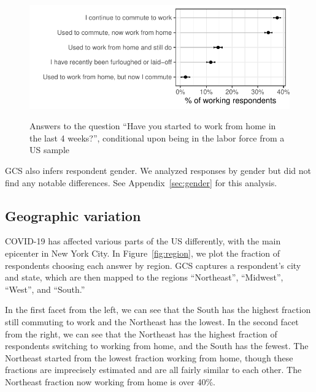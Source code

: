\documentclass[12pt]{article}
\begin{document}

\begin{figure}
  \caption{Answers to the question ``Have you started to work from home in the last 4 weeks?'', conditional upon being in the labor force from a US sample} \label{fig:working_summary}
\centering
\begin{minipage}{1.0 \linewidth}
  \includegraphics[width = \linewidth]{plots/working_summary.pdf} \\
  \begin{footnotesize}
    \end{footnotesize}
\end{minipage}
\end{figure} 

GCS also infers respondent gender.
We analyzed responses by gender but did not find any notable differences.
See Appendix~\ref{sec:gender} for this analysis. 

\subsection{Geographic variation} 
COVID-19 has affected various parts of the US differently, with the main epicenter in New York City.
In Figure~\ref{fig:region}, we plot the fraction of respondents choosing each answer by region.
GCS captures a respondent's city and state, which are then mapped to the regions ``Northeast'', ``Midwest'', ``West'', and ``South.'' 

In the first facet from the left, we can see that the South has the highest fraction still commuting to work and the Northeast has the lowest. 
In the second facet from the right, we can see that the Northeast has the highest fraction of respondents switching to working from home, and the South has the fewest.
The Northeast started from the lowest fraction working from home, though these fractions are imprecisely estimated and are all fairly similar to each other. 
The Northeast fraction now working from home is over 40\%. 
\end{document}
